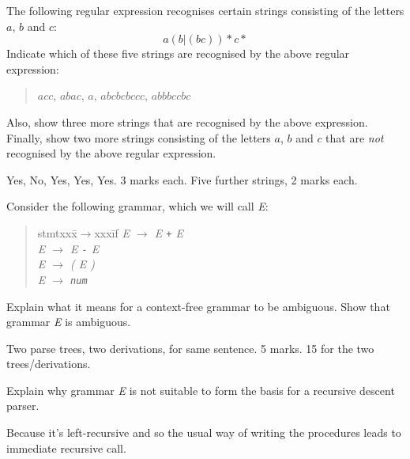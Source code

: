 \documentclass[11pt]{bareexam}
\begin{document}
\begin{questions}

\question

\begin{subquestions}

\subquestion
The following regular expression recognises certain strings consisting of the
letters $a$, $b$ and $c$:
\[
a(b|(bc))\!*c*
\]
Indicate which of these five strings are recognised by the above regular expression:
\begin{quote}
$acc$, $abac$, $a$, $abcbcbccc$, $abbbccbc$
\end{quote}
Also, show three more strings that are recognised by the above expression.
Finally, show two more strings consisting of 
the letters $a$, $b$ and $c$ that are \emph{not} 
recognised by the above regular expression.

\begin{modelanswer}
Yes, No, Yes, Yes, Yes. 3 marks each. 
Five further strings, 2 marks each.
\end{modelanswer}


\subquestion
Consider the following grammar, which we will call {\it E\/}:
\begin{quote}
\begin{tabbing}
stmtxxx\=$\rightarrow$xxx\=if\kill
\it
E \> $\rightarrow$ \> {\it E\/} \verb!+! {\it E} \\
\it
E \> $\rightarrow$ \> {\it E\/} \verb!-! {\it E} \\
\it
E \> $\rightarrow$ \> ( {\it E\/} ) \\
\it
E \> $\rightarrow$ \> \verb!num!
\end{tabbing}
\end{quote}

\begin{subsubquestions}
\subsubquestion
Explain what it means for a context-free grammar to be ambiguous. 
Show that grammar {\it E\/} is ambiguous.

\begin{modelanswer}
Two parse trees, two derivations, for same sentence. 5 marks.
15 for the two trees/derivations.
\end{modelanswer}

\subsubquestion
Explain why grammar {\it E\/} is not suitable to form the basis for a 
recursive descent parser.

\begin{modelanswer}
Because it's left-recursive and so the usual way of writing the 
procedures leads to immediate recursive call.
\end{modelanswer}


\end{subsubquestions}
\end{subquestions}
\end{questions}
\end{document}

